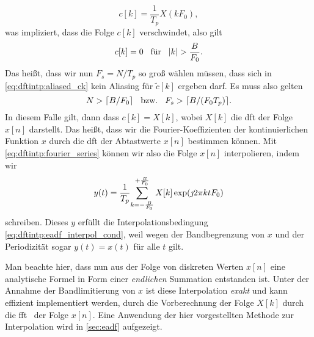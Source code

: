 \begin{equation}
    c[k] = \frac{1}{T_p} X(k F_0),
\end{equation}
was impliziert, dass die Folge $c[k]$ verschwindet, also gilt
\begin{equation}
    c[k] = 0 {\hspace{3mm} \text{f\"ur} \hspace{3mm}} {\left| k \right|} > \frac{B}{F_0}.
\end{equation}
Das hei{\ss}t, dass wir nun $F_s = N/T_p$ so gro{\ss} w\"ahlen m\"ussen, dass sich in \eqref{eq:dftintp:aliased_ck} kein Aliasing f\"ur $\tilde{c}[k]$ ergeben darf. Es muss also gelten
\begin{equation}
    N > \lceil B/F_0 \rceil {\hspace{3mm} \text{bzw.} \hspace{3mm}} F_s > \lceil B/(F_0 T_p) \rceil.
\end{equation}
In diesem Falle gilt, dann dass $c[k] = X[k]$, wobei $X[k]$ die \gls{dft} der Folge $x[n]$ darstellt. Das hei{\ss}t, dass wir die Fourier-Koeffizienten der kontinuierlichen Funktion $x$ durch die \gls{dft} der Abtastwerte $x[n]$ bestimmen k\"onnen. Mit \eqref{eq:dftintp:fourier_series} k\"onnen wir also die Folge $x[n]$ interpolieren, indem wir
\begin{equation}\label{eq:dftintp:dft_interpolation}
    y(t) = \frac{1}{T_p}{\sum\limits_{k=-\frac{B}{F_0}}^{+\frac{B}{F_0}}{
        X[k] \exp(\jmath 2 \pi k t F_0) 
    }}
\end{equation}
schreiben. Dieses $y$ erf\"ullt die Interpolationsbedingung \eqref{eq:dftintp:eadf_interpol_cond}, weil wegen der Bandbegrenzung von $x$ und der Periodizit\"at sogar $y(t) = x(t)$ f\"ur alle $t$ gilt.

Man beachte hier, dass nun aus der Folge von diskreten Werten $x[n]$ eine analytische Formel in Form einer \emph{endlichen} Summation entstanden ist. Unter der Annahme der Bandlimitierung von $x$ ist diese Interpolation \emph{exakt} und kann effizient implementiert werden, durch die Vorberechnung der Folge $X[k]$ durch die \gls{fft}~\cite{FFTW05} der Folge $x[n]$. Eine Anwendung der hier vorgestellten Methode zur Interpolation wird in \cref{sec:eadf} aufgezeigt.